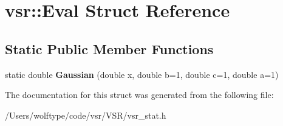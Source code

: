 \hypertarget{structvsr_1_1_eval}{\section{vsr\-:\-:Eval Struct Reference}
\label{structvsr_1_1_eval}
}
\subsection*{Static Public Member Functions}
\begin{DoxyCompactItemize}
\item 
\hypertarget{structvsr_1_1_eval_a22949cd3a6151a7adfb892fd706b0b87}{static double {\bfseries Gaussian} (double x, double b=1, double c=1, double a=1)}\label{structvsr_1_1_eval_a22949cd3a6151a7adfb892fd706b0b87}

\end{DoxyCompactItemize}


The documentation for this struct was generated from the following file\-:\begin{DoxyCompactItemize}
\item 
/\-Users/wolftype/code/vsr/\-V\-S\-R/vsr\-\_\-stat.\-h\end{DoxyCompactItemize}
